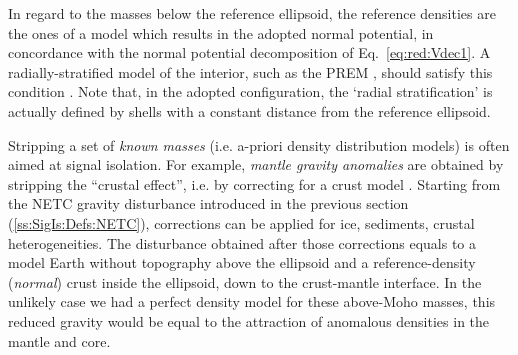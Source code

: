 In regard to the masses below the reference ellipsoid, the reference densities are the ones of a model which results in the adopted normal potential, in concordance with the normal potential decomposition of Eq.~\ref{eq:red:Vdec1}.
A radially-stratified model of the interior, such as the PREM \parencite[Preliminary Reference Earth Model,][]{Dziewonski1981}, should satisfy this condition \parencite{Tscherning1981}.
Note that, in the adopted configuration, the `radial stratification' is actually defined by shells with a constant distance from the reference ellipsoid.

Stripping a set of \textit{known masses} (i.e. a-priori density distribution models) is often aimed at signal isolation.
For example, \textit{mantle gravity anomalies} \parencites[e.g.][]{Mooney2010}{Kaban2014} are obtained by stripping the ``crustal effect'', i.e. by correcting for a crust model \parencite[e.g. {CRUST1.0},][]{Laske2012Crust10}.
Starting from the NETC gravity disturbance introduced in the previous section (\ref{ss:SigIs:Defs:NETC}), corrections can be applied for ice, sediments, crustal heterogeneities.
The disturbance obtained after those corrections equals to a model Earth without topography above the ellipsoid and a reference-density (\textit{normal}) crust inside the ellipsoid, down to the crust-mantle interface.
In the unlikely case we had a perfect density model for these above-Moho masses, this reduced gravity would be equal to the attraction of anomalous densities in the mantle and core.



